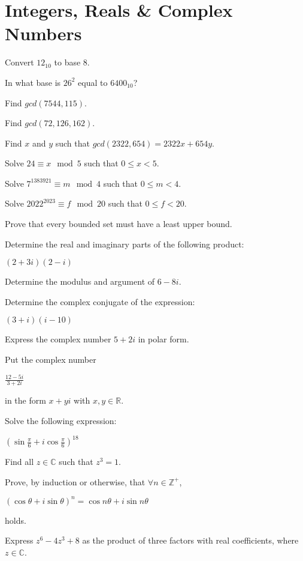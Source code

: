 \documentclass[12pt]{exam}
\begin{document}
\section{Integers, Reals \& Complex Numbers}
\begin{questions}

\question Convert $12_{10}$ to base 8.

\question In what base is $26^{2}$ equal to $6400_{10}$?

\question Find $gcd(7544,115)$.

\question Find $gcd(72,126,162)$.

\question Find $x$ and $y$ such that $gcd(2322,654) = 2322x + 654y$.

\question Solve $24 \equiv x\mod{5}$ such that $ 0 \leq x < 5$.

\question Solve $7^{1383921} \equiv m\mod{4}$ such that $ 0 \leq m < 4$.

\question Solve $2022^{2023} \equiv f\mod{20}$ such that $ 0 \leq f < 20$.

\question Prove that every bounded set must have a least upper bound.

\question Determine the real and imaginary parts of the following product:

\begin{center}
    $(2+3i)(2-i)$
\end{center}

\question Determine the modulus and argument of $6-8i$.

\question Determine the complex conjugate of the expression:
\begin{center}
    $(3+i)(i-10)$
\end{center}

\question Express the complex number $5+2i$ in polar form.

\question Put the complex number

\begin{center}
    \Large $\frac{12-5i}{3+2i}$
\end{center}

in the form $x+yi$ with $x,y \in \mathbb{R}$.

\question Solve the following expression:

\begin{center}
    \large $(\sin{\frac{\pi}{6}} + i\cos{\frac{\pi}{6}})^{18}$
\end{center}

\question Find all $z \in \mathbb{C}$ such that $z^{3} = 1$.

\question Prove, by induction or otherwise, that $\forall n \in \mathbb{Z}^{+}$,

\begin{center}
    $(\cos{\theta} + i\sin{\theta})^{n} = \cos{n\theta} + i\sin{n\theta}$
\end{center}

holds.

\question Express $z^{6} - 4z^{3} + 8$ as the product of three factors with real coefficients, where $z \in \mathbb{C}$.

\end{questions}
\end{document}
